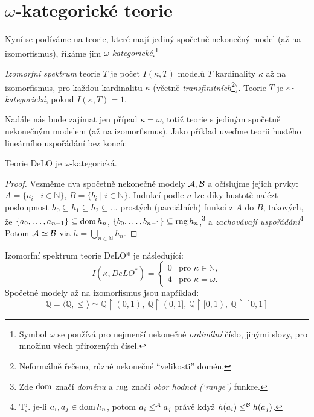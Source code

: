 \section{$\omega$-kategorické teorie}\label{section:categoricity}

Nyní se podíváme na teorie, které mají jediný spočetně nekonečný model (až na izomorfismus), říkáme jim \emph{$\omega$-kategorické}.\footnote{Symbol $\omega$ se používá pro nejmenší nekonečné \emph{ordinální} číslo, jinými slovy, pro množinu všech přirozených čísel.}

\begin{definition}
    \emph{Izomorfní spektrum} teorie $T$ je počet $
    I(\kappa,T)$ modelů $T$ kardinality $\kappa$ až na izomorfismus, pro každou kardinalitu $\kappa$ (včetně \emph{transfinitních}\footnote{Neformálně řečeno, různé nekonečné ``velikosti'' domén.}). Teorie $T$ je \emph{$\kappa$-kategorická}, pokud $I(\kappa,T)=1$.
\end{definition}

Nadále nás bude zajímat jen případ $\kappa=\omega$, totiž teorie s jediným spočetně nekonečným modelem (až na izomorfismus). Jako příklad uveďme teorii hustého lineárního uspořádání bez konců:

\begin{proposition}
    Teorie DeLO je $\omega$-kategorická.
\end{proposition}
\begin{proof}
Vezměme dva spočetně nekonečné modely $\mathcal{A},\mathcal{B}$ a očíslujme jejich prvky: $A=\{a_i\mid i\in\mathbb N\}$, $B=\{b_i\mid i\in\mathbb N\}$. Indukcí podle $n$ lze díky hustotě nalézt posloupnost $h_0\subseteq h_1\subseteq h_2\subseteq\dots$ prostých (parciálních) funkcí z $A$ do $B$, takových, že $\{a_0,\dots,a_{n-1}\}\subseteq\operatorname{dom} h_n$, $\{b_0,\dots,b_{n-1}\}\subseteq\operatorname{rng} h_n$,\footnote{Zde $\operatorname{dom}$ značí \emph{doménu} a $\operatorname{rng}$ značí \emph{obor hodnot (`range')} funkce.} a \emph{zachovávají uspořádání}\footnote{Tj. je-li $a_i,a_j\in\operatorname{dom} h_n$, potom $a_i\leq^{\mathcal{A}} a_j$ právě když $h(a_i)\leq^{\mathcal{B}} h(a_j)$.} Potom $\mathcal{A}\simeq\mathcal{B}$ via $h=\bigcup_{n\in\mathbb N}h_n$.
\end{proof}

\begin{corollary}
Izomorfní spektrum teorie DeLO* je následující:
$$
I(\kappa,DeLO^*)=\begin{cases}
    0 &\text{pro }\kappa\in\mathbb{N},\\
    4 &\text{pro }\kappa=\omega.
\end{cases}
$$
Spočetné modely až na izomorfismus jsou například:
$$ 
\mathbb Q=\langle \mathbb Q,\leq\rangle\simeq\mathbb Q\upharpoonright(0,1), \ \mathbb Q\upharpoonright(0,1], \ \mathbb Q \upharpoonright [0,1), \ \mathbb Q \upharpoonright [0,1]
$$
\end{corollary}

